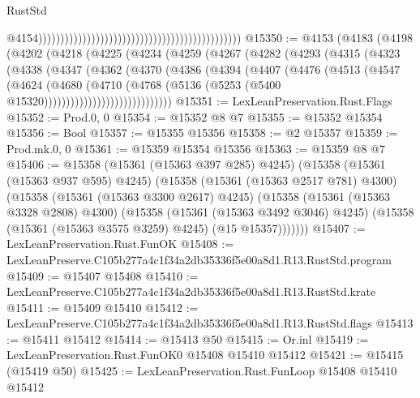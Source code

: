 \begin{lexlean}{RustStd}
\begin{coremodule}
                                                                                                @4154))))))))))))))))))))))))))))))))))))))))))))))
@15350 := @4153
    (@4183
      (@4198
        (@4202
          (@4218
            (@4225
              (@4234
                (@4259
                  (@4267
                    (@4282
                      (@4293
                        (@4315
                          (@4323
                            (@4338
                              (@4347
                                (@4362
                                  (@4370
                                    (@4386
                                      (@4394
                                        (@4407
                                          (@4476
                                            (@4513
                                              (@4547
                                                (@4624
                                                  (@4680
                                                    (@4710
                                                      (@4768
                                                        (@5136
                                                          (@5253
                                                            (@5400
                                                              @15320)))))))))))))))))))))))))))))
@15351 := LexLeanPreservation.Rust.Flags
@15352 := Prod.{0, 0}
@15354 := @15352 @8 @7
@15355 := @15352 @15354
@15356 := Bool
@15357 := @15355 @15356
@15358 := @2 @15357
@15359 := Prod.mk.{0, 0}
@15361 := @15359 @15354 @15356
@15363 := @15359 @8 @7
@15406 := @15358
    (@15361 (@15363 @397 @285) @4245)
    (@15358
      (@15361 (@15363 @937 @595) @4245)
      (@15358
        (@15361 (@15363 @2517 @781) @4300)
        (@15358
          (@15361 (@15363 @3300 @2617) @4245)
          (@15358
            (@15361 (@15363 @3328 @2808) @4300)
            (@15358
              (@15361 (@15363 @3492 @3046) @4245)
              (@15358 (@15361 (@15363 @3575 @3259) @4245) (@15 @15357)))))))
@15407 := LexLeanPreservation.Rust.FunOK
@15408 := LexLeanPreserve.C105b277a4c1f34a2db35336f5e00a8d1.R13.RustStd.program
@15409 := @15407 @15408
@15410 := LexLeanPreserve.C105b277a4c1f34a2db35336f5e00a8d1.R13.RustStd.krate
@15411 := @15409 @15410
@15412 := LexLeanPreserve.C105b277a4c1f34a2db35336f5e00a8d1.R13.RustStd.flags
@15413 := @15411 @15412
@15414 := @15413 @50
@15415 := Or.inl
@15419 := LexLeanPreservation.Rust.FunOK0 @15408 @15410 @15412
@15421 := @15415 (@15419 @50)
@15425 := LexLeanPreservation.Rust.FunLoop @15408 @15410 @15412

\end{coremodule}
\end{lexlean}
